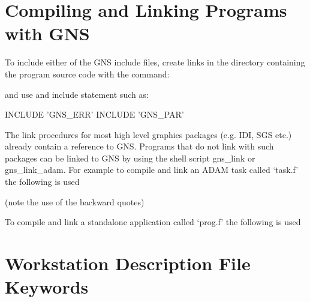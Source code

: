 \documentclass[twoside,11pt,nolof]{starlink}
\begin{document}
\section{Compiling and Linking Programs with GNS}\label{cl}

To include either of the GNS include files, create links in the directory
containing the program source code with the command:
\begin{terminalv}
\end{terminalv}
and use and include statement such as:
\begin{terminalv}
      INCLUDE 'GNS_ERR'
      INCLUDE 'GNS_PAR'
\end{terminalv}

The link procedures for most high level graphics packages (e.g. IDI, SGS etc.)
already contain a reference to GNS. Programs that do not link with such
packages can be linked to GNS by using the shell script gns\_link
or gns\_link\_adam. For example to compile and link an ADAM task called
`task.f' the following is used
\begin{terminalv}
\end{terminalv}
(note the use of the backward quotes)

To compile and link a standalone application called `prog.f' the following
is used
\begin{terminalv}
\end{terminalv}

\clearpage
\appendix
\section{Workstation Description File Keywords}\label{key}
\end{document}
